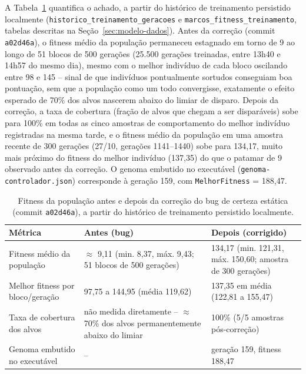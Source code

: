 \documentclass[12pt,a4paper]{article}
\begin{document}
A Tabela~\ref{tab:fitness-antes-depois} quantifica o achado, a partir do histórico de treinamento
persistido localmente (\texttt{historico\_treinamento\_geracoes} e
\texttt{marcos\_fitness\_treinamento}, tabelas descritas na Seção~\ref{sec:modelo-dados}). Antes da
correção (commit \texttt{a02d46a}), o fitness médio da população permaneceu estagnado em torno de 9
ao longo de 51 blocos de 500 gerações (25.500 gerações treinadas, entre 13h40 e 14h57 do mesmo dia),
mesmo com o melhor indivíduo de cada bloco oscilando entre 98 e 145 -- sinal de que indivíduos
pontualmente sortudos conseguiam boa pontuação, sem que a população como um todo convergisse,
exatamente o efeito esperado de 70\% dos alvos nascerem abaixo do limiar de disparo. Depois da
correção, a taxa de cobertura (fração de alvos que chegam a ser disparáveis) sobe para 100\% em
todas as cinco amostras de comportamento do melhor indivíduo registradas na mesma tarde, e o
fitness médio da população em uma amostra recente de 300 gerações (27/10, gerações 1141--1440) sobe
para 134,17, muito mais próximo do fitness do melhor indivíduo (137,35) do que o patamar de 9
observado antes da correção. O genoma embutido no executável (\texttt{genoma-controlador.json})
corresponde à geração 159, com \texttt{MelhorFitness} = 188,47.

\begin{table}[htbp]
  \centering
  \caption{Fitness da população antes e depois da correção do bug de certeza estática (commit
  \texttt{a02d46a}), a partir do histórico de treinamento persistido localmente.}
  \label{tab:fitness-antes-depois}
  \small
  \renewcommand{\arraystretch}{1.2}
  \begin{tabular}{p{4.6cm}p{3.6cm}p{3.6cm}}
    \hline
    \textbf{Métrica} & \textbf{Antes (bug)} & \textbf{Depois (corrigido)} \\
    \hline
    Fitness médio da população & $\approx$ 9,11 (min. 8,37, máx. 9,43; 51 blocos de 500 gerações) &
    134,17 (min. 121,31, máx. 150,60; amostra de 300 gerações) \\
    Melhor fitness por bloco/geração & 97,75 a 144,95 (média 119,62) & 137,35 em média
    (122,81 a 155,47) \\
    Taxa de cobertura dos alvos & não medida diretamente -- $\approx$ 70\% dos alvos
    permanentemente abaixo do limiar & 100\% (5/5 amostras pós-correção) \\
    Genoma embutido no executável & -- & geração 159, fitness 188,47 \\
    \hline
  \end{tabular}
\end{table}
\end{document}
